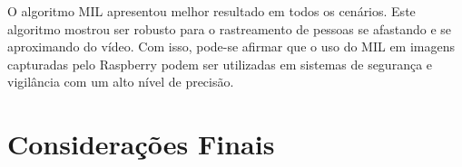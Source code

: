 \documentclass[12pt,oneside,a4paper,chapter=TITLE,section=TITLE,sumario=tradicional]{abntex2}
\begin{document}

O algoritmo MIL apresentou melhor resultado em todos os cenários. Este algoritmo mostrou ser robusto para o rastreamento de pessoas se afastando e se aproximando do vídeo. Com isso, pode-se afirmar que o uso do MIL em imagens capturadas pelo Raspberry podem ser utilizadas em sistemas de segurança e vigilância com um alto nível de precisão.


\chapter{Considerações Finais}
\label{cap:conclusao}










\end{document}
